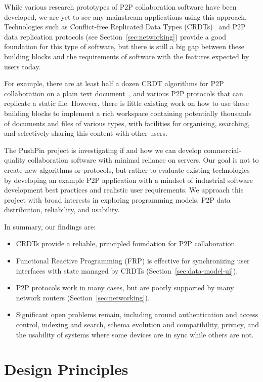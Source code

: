 \documentclass[sigplan,10pt]{acmart}
\begin{document}
While various research prototypes of P2P collaboration software have been developed, we are yet to see any mainstream applications using this approach.
Technologies such as Conflict-free Replicated Data Types (CRDTs)~\cite{Shapiro:2011un} and P2P data replication protocols (see Section~\ref{sec:networking}) provide a good foundation for this type of software, but there is still a big gap between these building blocks and the requirements of software with the features expected by users today.

For example, there are at least half a dozen CRDT algorithms for P2P collaboration on a plain text document~\cite{Kleppmann:2019iu}, and various P2P protocols that can replicate a static file.
However, there is little existing work on how to use these building blocks to implement a rich workspace containing potentially thousands of documents and files of various types, with facilities for organising, searching, and selectively sharing this content with other users.

The PushPin project is investigating if and how we can develop commercial-quality collaboration software with minimal reliance on servers.
Our goal is not to create new algorithms or protocols, but rather to evaluate existing technologies by developing an example P2P application with a mindset of industrial software development best practices and realistic user requirements.
We approach this project with broad interests in exploring programming models, P2P data distribution, reliability, and usability.

In summary, our findings are:
\begin{itemize}
    \item CRDTs provide a reliable, principled foundation for P2P collaboration.
    \item Functional Reactive Programming (FRP) is effective for synchronizing user interfaces with state managed by CRDTs (Section~\ref{sec:data-model-ui}).
    \item P2P protocols work in many cases, but are poorly supported by many network routers (Section~\ref{sec:networking}).
    \item Significant open problems remain, including around authentication and access control, indexing and search, schema evolution and compatibility, privacy, and the usability of systems where some devices are in sync while others are not.
\end{itemize}

\section{Design Principles}\label{sec:principles}
\end{document}
